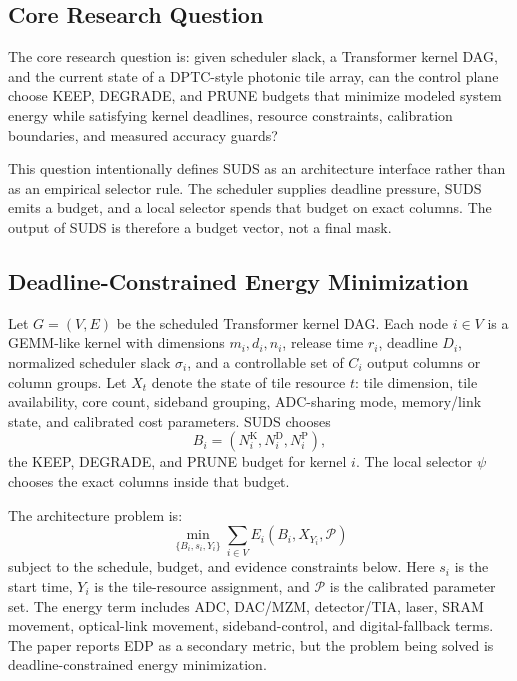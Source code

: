 \documentclass[10pt,journal]{IEEEtran}
\begin{document}
\subsection{Core Research Question}

The core research question is: given scheduler slack, a Transformer kernel
DAG, and the current state of a DPTC-style photonic tile array, can the control
plane choose KEEP, DEGRADE, and PRUNE budgets that minimize modeled system
energy while satisfying kernel deadlines, resource constraints, calibration
boundaries, and measured accuracy guards?

This question intentionally defines SUDS as an architecture interface rather
than as an empirical selector rule. The scheduler supplies deadline pressure,
SUDS emits a budget, and a local selector spends that budget on exact columns.
The output of SUDS is therefore a budget vector, not a final mask.

\subsection{Deadline-Constrained Energy Minimization}

Let \(G=(V,E)\) be the scheduled Transformer kernel DAG. Each node
\(i \in V\) is a GEMM-like kernel with dimensions \(m_i,d_i,n_i\), release
time \(r_i\), deadline \(D_i\), normalized scheduler slack \(\sigma_i\), and
a controllable set of \(C_i\) output columns or column groups. Let \(X_t\)
denote the state of tile resource \(t\): tile dimension, tile availability,
core count, sideband grouping, ADC-sharing mode, memory/link state, and
calibrated cost parameters. SUDS chooses
\[
B_i = (N_i^{\mathrm{K}},N_i^{\mathrm{D}},N_i^{\mathrm{P}}),
\]
the KEEP, DEGRADE, and PRUNE budget for kernel \(i\). The local selector
\(\psi\) chooses the exact columns inside that budget.

The architecture problem is:
\begin{equation}
\min_{\{B_i,s_i,Y_i\}}
\sum_{i \in V} E_i(B_i,X_{Y_i},\mathcal{P})
\label{eq:suds-energy-objective}
\end{equation}
subject to the schedule, budget, and evidence constraints below. Here
\(s_i\) is the start time, \(Y_i\) is the tile-resource assignment, and
\(\mathcal{P}\) is the calibrated parameter set. The energy term includes ADC,
DAC/MZM, detector/TIA, laser, SRAM movement, optical-link movement,
sideband-control, and digital-fallback terms. The paper reports EDP as a
secondary metric, but the problem being solved is deadline-constrained energy
minimization.
\end{document}
